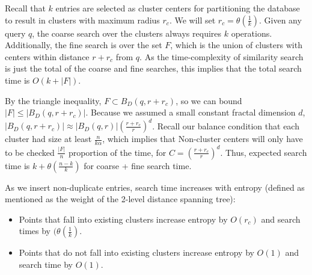 \documentclass{amsbook}
\theoremstyle{definition}
\theoremstyle{remark}
\numberwithin{equation}{section}
\begin{document}
Recall that $k$ entries are selected as cluster centers for partitioning the database to result in clusters with maximum radius $r_c$.
We will set $r_c = \theta(\frac{1}{k})$.
Given any query $q$, the coarse search over the clusters always requires $k$ operations.
Additionally, the fine search is over the set $F$, which is the union of clusters with centers within distance $r+r_c$ from $q$.
As the time-complexity of similarity search is just the total of the coarse and fine searches, this implies that the total search time is $O(k + |F|)$.

By the triangle inequality, $F \subset B_D(q,r+r_c)$,
so we can bound $|F| \le |B_D(q,r+r_c)|$.
Because we assumed a small constant fractal dimension $d$, $ |B_D(q, r+r_c)| \approx |B_D(q,r)|\left(\frac{r+r_c}{r}\right)^d$.
Recall our balance condition that each cluster had size at least $\frac{n}{k\alpha}$, which implies that
Non-cluster centers will only have to be checked $\frac{|F|}{n}$ proportion of the time, for $C = \left(\frac{r+r_c}{r}\right)^d$.
Thus, expected search time is $k + \theta \left( \frac{n-k}{k} \right)$ for coarse + fine search time.

As we insert non-duplicate entries, search time increases with entropy (defined as mentioned as the weight of the 2-level distance spanning tree):
\begin{itemize}
    \item Points that fall into existing clusters increase entropy by $O(r_c)$ and search times by $(\theta \left( \frac{1}{k} \right)$.
    \item Points that do not fall into existing clusters increase entropy by $O(1)$  and search time by $O(1)$.
\end{itemize}
\end{document}
